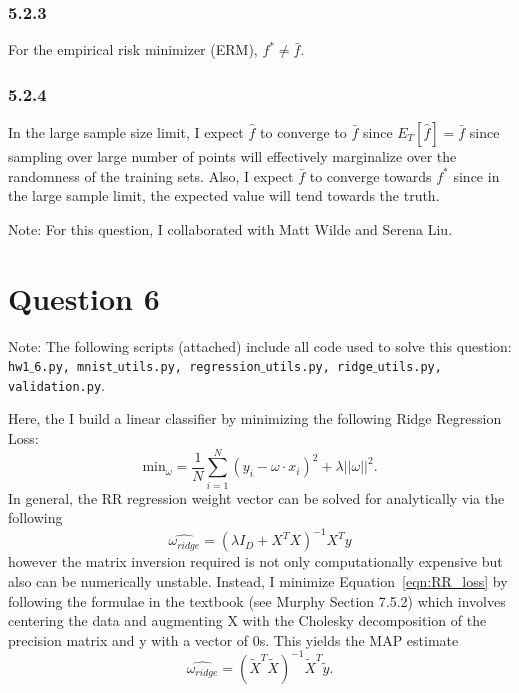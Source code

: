 \documentclass[12pt]{amsart}
\begin{document}
\subsubsection*{5.2.3}
For the empirical risk minimizer (ERM), $f^{*} \neq \bar{f}$.

\subsubsection*{5.2.4}
In the large sample size limit, I expect $\hat{f}$ to converge to $\bar{f}$ since $E_T[\hat{f}] = \bar{f}$ since sampling over large number of points will effectively marginalize over the randomness of the training sets.  Also, I expect $\bar{f}$ to converge towards $f^{*}$ since in the large sample limit, the expected value will tend towards the truth.

Note: For this question, I collaborated with Matt Wilde and Serena Liu.


\section*{Question 6}

Note: The following scripts (attached) include all code used to solve this question: {\tt hw1$\_$6.py, mnist$\_$utils.py, regression$\_$utils.py, ridge$\_$utils.py, validation.py}.

Here, the I build a linear classifier by minimizing the following Ridge Regression Loss:
\begin{equation} \label{eqn:RR_loss}
\text{min}_{\omega} = \frac{1}{N} \sum_{i = 1}^N (y_i - \omega \cdot x_i)^2 + \lambda || \omega ||^2.
\end{equation}
In general, the RR regression weight vector can be solved for analytically via the following
\begin{equation} \label{eqn:RR_w}
\hat{\omega_{ridge}} = (\lambda I_D + X^T X)^{-1} X^T y
\end{equation}
however the matrix inversion required is not only computationally expensive but also can be numerically unstable.  Instead, I minimize Equation~\ref{eqn:RR_loss} by following the formulae in the textbook (see Murphy Section 7.5.2) which involves centering the data and augmenting X with the Cholesky decomposition of the precision matrix and y with a vector of 0s.  This yields the MAP estimate
\begin{equation} \label{eqn:RR_w_murphy}
\hat{\omega_{ridge}} = (\tilde{X}^T \tilde{X})^{-1} \tilde{X}^T \tilde{y}.
\end{equation}
\end{document}
